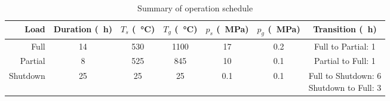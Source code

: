 \begin{table}[htb!]
  \centering
  \caption{Summary of operation schedule}
  \begin{tabular}{r c c c c c c}
    \toprule
    Load     & Duration (\SI{}{\hour}) & $T_s$ (\SI{}{\celsius}) & $T_g$ (\SI{}{\celsius}) & $p_s$ (\SI{}{\mega\pascal}) & $p_g$ (\SI{}{\mega\pascal}) & Transition (\SI{}{\hour})        \\
    \midrule
    Full     & 14                      & 530                     & 1100                    & 17                          & 0.2                         & Full to Partial: 1               \\
    Partial  & 8                       & 525                     & 845                     & 10                          & 0.1                         & Partial to Full: 1               \\
    Shutdown & 25                      & 25                      & 25                      & 0.1                         & 0.1                         & \makecell[t]{Full to Shutdown: 6 \\ Shutdown to Full: 3}       \\
    \bottomrule
  \end{tabular}
  \label{tab: oxide}
\end{table}




